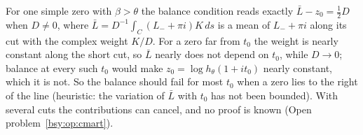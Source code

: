 For one simple zero with $\beta>\theta$ the balance condition reads exactly $\bar L-z_0=\frac12D$ when $D\ne0$, where $\bar L=D^{-1}\int_C(L_-+\pi i)K\,ds$ is a mean of $L_-+\pi i$ along its cut with the complex weight $K/D$. For a zero far from $t_0$ the weight is nearly constant along the short cut, so $\bar L$ nearly does not depend on $t_0$, while $D\to0$; balance at every such $t_0$ would make $z_0=\log h_\theta(1+it_0)$ nearly constant, which it is not. So the balance should fail for most $t_0$ when a zero lies to the right of the line (heuristic: the variation of $\bar L$ with $t_0$ has not been bounded). With several cuts the contributions can cancel, and no proof is known (Open problem~\ref{bsy:op:cmart}).

